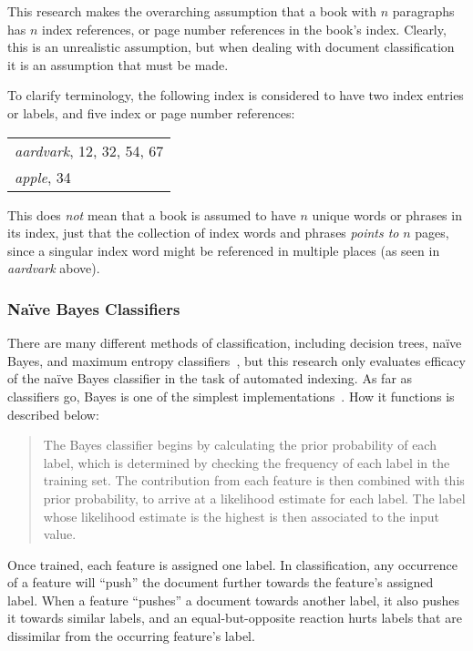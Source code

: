 This research makes the overarching assumption that a book with $n$ paragraphs has $n$ index references, or page number references in the book's index.
Clearly, this is an unrealistic assumption, but when dealing with document classification it is an assumption that must be made.

To clarify terminology, the following index is considered to have two index entries or labels, and five index or page number references:

\begin{center}
\begin{tabular}{l}
\textit{aardvark}, 12, 32, 54, 67 \\
\textit{apple}, 34
\end{tabular} 


\end{center}

\noindent This does {\it not} mean that a book is assumed to have $n$ unique words or phrases in its index, just that the collection of index words and phrases {\it points to} $n$ pages, since a singular index word might be referenced in multiple places (as seen in {\it aardvark} above).

\subsubsection{Na{\"i}ve Bayes Classifiers}

There are many different methods of classification, including decision trees, na{\"i}ve Bayes, and maximum entropy classifiers~\cite{nlpwp}, but this research only evaluates efficacy of the na{\"i}ve Bayes classifier in the task of automated indexing.
As far as classifiers go, \naive Bayes is one of the simplest implementations~\cite{rish}.
How it functions is described below:
\begin{quote}
The \naive Bayes classifier begins by calculating the prior probability of each label, which is determined by checking the frequency of each label in the training set. The contribution from each feature is then combined with this prior probability, to arrive at a likelihood estimate for each label. The label whose likelihood estimate is the highest is then associated to the input value.~\cite{nlpwp}
\end{quote}
\noindent Once trained, each feature is assigned one label.
In classification, any occurrence of a feature will ``push'' the document further towards the feature's assigned label.
When a feature ``pushes'' a document towards another label, it also pushes it towards similar labels, and an equal-but-opposite reaction hurts labels that are dissimilar from the occurring feature's label.

